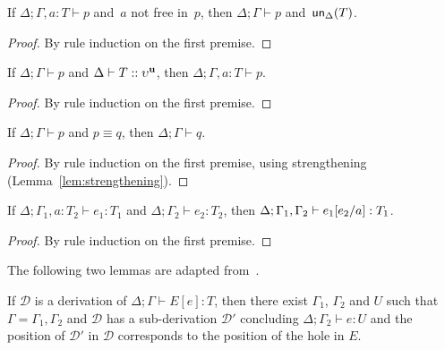 \begin{lemma}[Strengthening]
  \label{lem:strengthening}
  If $\Delta;\Gamma,a\colon T \vdash p$ and~$a$ not free in~$p$, then
  $\Delta;\Gamma \vdash p$ and~$\mathsf{un}_\Delta(T)$.
\end{lemma}
%
\begin{proof}
  By rule induction on the first premise.
\end{proof}

\begin{lemma}[Weakening]
  \label{lem:weakening}
  If $\Delta;\Gamma \vdash p$ and $\Delta \vdash T::\upsilon^{\mathbf{u}}$, then
  $\Delta;\Gamma, a\colon T \vdash p$.
\end{lemma}
%
\begin{proof}
  By rule induction on the first premise.
\end{proof}

\begin{lemma}[Congruence]
  \label{lem:congruence}
  If $\Delta;\Gamma \vdash p$ and $p\equiv q$, then
  $\Delta;\Gamma \vdash q$.
\end{lemma}
%
\begin{proof}
  By rule induction on the first premise, using strengthening
  (Lemma~\ref{lem:strengthening}).
\end{proof}

\begin{lemma}[Substitution]
  \label{lem:subs}
  If $\Delta;\Gamma_1, a\colon T_2 \vdash e_1 : T_1$ and
  $\Delta;\Gamma_2 \vdash e_2 : T_2$, then
  $\Delta;\Gamma_1,\Gamma_2 \vdash e_1 [{e_2}/{a}] : T_1$.
\end{lemma}
%
\begin{proof}
  By rule induction on the first premise.
\end{proof}

The following two lemmas are adapted from~\cite{DBLP:journals/jfp/GayV10}.

\begin{lemma}
  \label{lem:derivation-intro}
  If $\mathcal D$ is a derivation of $\Delta;\Gamma \vdash E[e] : T$,
  then there exist $\Gamma_1$, $\Gamma_2$ and $U$ such that
  $\Gamma = \Gamma_1,\Gamma_2$ and $\mathcal D$ has a sub-derivation
  $\mathcal D'$ concluding $\Delta;\Gamma_2 \vdash e : U$ and the
  position of $\mathcal D'$ in $\mathcal D$ corresponds to the
  position of the hole in $E$.
\end{lemma}

